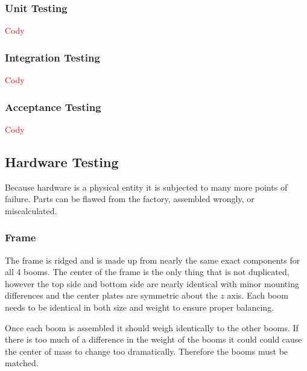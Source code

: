 \documentclass{article}
\numberwithin{equation}{section} %
\begin{document}
\subsubsection{Unit Testing}
\textcolor{red}{Cody}

\subsubsection{Integration Testing}
\textcolor{red}{Cody}

\subsubsection{Acceptance Testing}
\textcolor{red}{Cody}

\subsection{Hardware Testing}
Because hardware is a physical entity it is subjected to many more points of failure. Parts can be flawed from the factory, assembled wrongly, or miscalculated.

\subsubsection{Frame}
The frame is ridged and is made up from nearly the same exact components for all 4 booms. The center of the frame is the only thing that is not duplicated, however the top side and bottom side are nearly identical with minor mounting differences and the center plates are symmetric about the $z$ axis. Each boom needs to be identical in both size and weight to ensure proper balancing.

Once each boom is assembled it should weigh identically to the other booms. If there is too much of a difference in the weight of the booms it could could cause the center of mass to change too dramatically. Therefore the booms must be matched.
\end{document}
